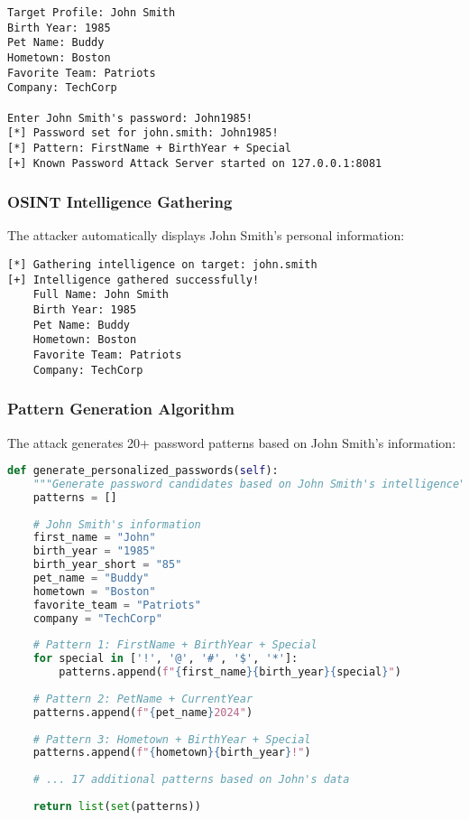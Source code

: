 \documentclass[12pt,a4paper]{article}
\begin{document}
\begin{lstlisting}[caption=John Smith Profile Configuration]
Target Profile: John Smith
Birth Year: 1985
Pet Name: Buddy
Hometown: Boston
Favorite Team: Patriots
Company: TechCorp

Enter John Smith's password: John1985!
[*] Password set for john.smith: John1985!
[*] Pattern: FirstName + BirthYear + Special
[+] Known Password Attack Server started on 127.0.0.1:8081
\end{lstlisting}

\subsubsection{OSINT Intelligence Gathering}

The attacker automatically displays John Smith's personal information:

\begin{lstlisting}[caption=OSINT Intelligence Display]
[*] Gathering intelligence on target: john.smith
[+] Intelligence gathered successfully!
    Full Name: John Smith
    Birth Year: 1985
    Pet Name: Buddy
    Hometown: Boston
    Favorite Team: Patriots
    Company: TechCorp
\end{lstlisting}

\subsubsection{Pattern Generation Algorithm}

The attack generates 20+ password patterns based on John Smith's information:

\begin{lstlisting}[language=Python, caption=Password Pattern Generation]
def generate_personalized_passwords(self):
    """Generate password candidates based on John Smith's intelligence"""
    patterns = []
    
    # John Smith's information
    first_name = "John"
    birth_year = "1985"
    birth_year_short = "85"
    pet_name = "Buddy"
    hometown = "Boston"
    favorite_team = "Patriots"
    company = "TechCorp"
    
    # Pattern 1: FirstName + BirthYear + Special
    for special in ['!', '@', '#', '$', '*']:
        patterns.append(f"{first_name}{birth_year}{special}")
    
    # Pattern 2: PetName + CurrentYear
    patterns.append(f"{pet_name}2024")
    
    # Pattern 3: Hometown + BirthYear + Special
    patterns.append(f"{hometown}{birth_year}!")
    
    # ... 17 additional patterns based on John's data
    
    return list(set(patterns))
\end{lstlisting}
\end{document}
